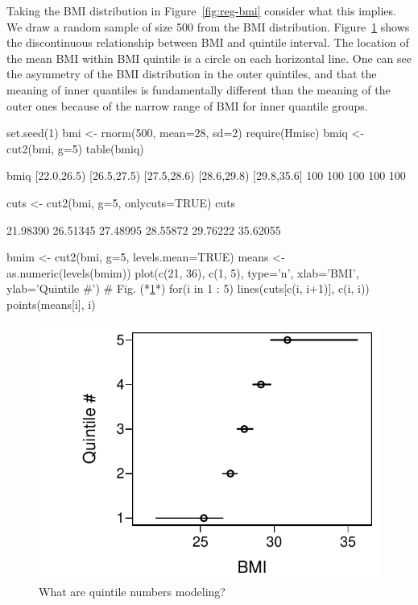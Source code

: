 Taking the BMI distribution in Figure~\ref{fig:reg-bmi} consider what
this implies.  We draw a random sample of size 500 from
the BMI distribution.  Figure~\ref{fig:reg-bmiq} shows the
discontinuous relationship between BMI and quintile interval.  The
location of the mean BMI within BMI quintile is a circle on each
horizontal line.  One can see the asymmetry of the BMI distribution
in the outer quintiles, and that the meaning of inner quantiles is
fundamentally different than the meaning of the outer ones because of
the narrow range of BMI for inner quantile groups.
\begin{Schunk}
\begin{Sinput}
set.seed(1)
bmi  <- rnorm(500, mean=28, sd=2)
require(Hmisc)
bmiq <- cut2(bmi, g=5)
table(bmiq)
\end{Sinput}
\begin{Soutput}
bmiq
[22.0,26.5) [26.5,27.5) [27.5,28.6) [28.6,29.8) [29.8,35.6] 
        100         100         100         100         100 
\end{Soutput}
\begin{Sinput}
cuts <- cut2(bmi, g=5, onlycuts=TRUE)
cuts
\end{Sinput}
\begin{Soutput}
[1] 21.98390 26.51345 27.48995 28.55872 29.76222 35.62055
\end{Soutput}
\begin{Sinput}
bmim <- cut2(bmi, g=5, levels.mean=TRUE)
means <- as.numeric(levels(bmim))
plot(c(21, 36), c(1, 5), type='n', xlab='BMI', ylab='Quintile #')   # Fig. (*\ref{fig:reg-bmiq}*)
for(i in 1 : 5) {
  lines(cuts[c(i, i+1)], c(i, i))
  points(means[i], i)
}
\end{Sinput}
\begin{figure}[htbp]

\centerline{\includegraphics[width=\maxwidth]{reg-bmiq-1} }

\caption[What are quintile numbers modeling?]{What are quintile numbers modeling?}\label{fig:reg-bmiq}
\end{figure}
\end{Schunk}

